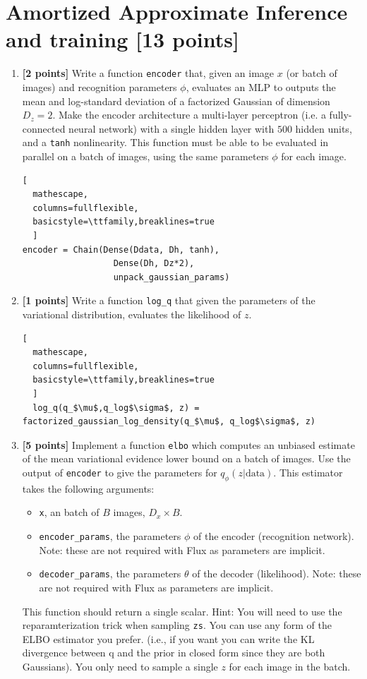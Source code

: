 \documentclass{article}
\begin{document}
\section{Amortized Approximate Inference and training [13 points]}
\begin{enumerate}[label=(\alph*)]
  \item {\bf [2 points]} Write a function \texttt{encoder} that, given an image $x$ (or batch of images) and recognition parameters $\phi$, evaluates an MLP to outputs the mean and log-standard deviation of a factorized Gaussian of dimension $D_z = 2$.
	Make the encoder architecture a multi-layer perceptron (i.e. a fully-connected neural network) with a single hidden layer with $500$ hidden units, and a \texttt{tanh} nonlinearity.
	This function must be able to be evaluated in parallel on a batch of images, using the same parameters $\phi$ for each image.

\begin{lstlisting}[
  mathescape,
  columns=fullflexible,
  basicstyle=\ttfamily,breaklines=true
  ]
encoder = Chain(Dense(Ddata, Dh, tanh),
                  Dense(Dh, Dz*2),
                  unpack_gaussian_params)
\end{lstlisting}
        
  \item {\bf [1 points]} Write a function \texttt{log\_q} that given the parameters of the variational distribution, evaluates the likelihood of $z$.

\begin{lstlisting}[
  mathescape,
  columns=fullflexible,
  basicstyle=\ttfamily,breaklines=true
  ]
  log_q(q_$\mu$,q_log$\sigma$, z) =  factorized_gaussian_log_density(q_$\mu$, q_log$\sigma$, z)
\end{lstlisting}
                
\item {\bf [5 points]} Implement a function \texttt{elbo} which computes an unbiased estimate of the mean variational evidence lower bound on a batch of images.
	Use the output of \texttt{encoder} to give the parameters for $q_\phi(z|\text{data})$.
	This estimator takes the following arguments:
	\begin{itemize}
		\item \texttt{x}, an batch of $B$ images, $D_x \times B$.
    \item \texttt{encoder\_params}, the parameters $\phi$ of the encoder (recognition network). Note: these are not required with Flux as parameters are implicit.
		\item \texttt{decoder\_params}, the parameters $\theta$ of the decoder (likelihood). Note: these are not required with Flux as parameters are implicit.
	\end{itemize}
	This function should return a single scalar.
	Hint: You will need to use the reparamterization trick when sampling \texttt{zs}.
	You can use any form of the ELBO estimator you prefer.
  (i.e., if you want you can write the KL divergence between q and the prior in closed form since they are both Gaussians).
	You only need to sample a single $z$ for each image in the batch.


\end{enumerate}
\end{document}
